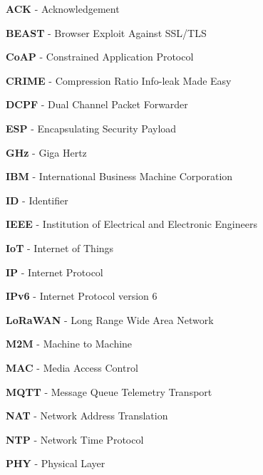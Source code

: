 \documentclass{article}
\begin{document}
\textbf{ACK} - Acknowledgement
\newline

\textbf{BEAST} - Browser Exploit Against SSL/TLS
\newline

\textbf{CoAP} - Constrained Application Protocol
\newline

\textbf{CRIME} - Compression Ratio Info-leak Made Easy
\newline

\textbf{DCPF} - Dual Channel Packet Forwarder
\newline

\textbf{ESP} - Encapsulating Security Payload
\newline

\textbf{GHz} - Giga Hertz
\newline

\textbf{IBM} - International Business Machine Corporation
\newline

\textbf{ID} - Identifier
\newline

\textbf{IEEE} - Institution of Electrical and Electronic Engineers
\newline

\textbf{IoT} - Internet of Things
\newline

\textbf{IP} - Internet Protocol
\newline

\textbf{IPv6} - Internet Protocol version 6
\newline

\textbf{LoRaWAN} - Long Range Wide Area Network
\newline

\textbf{M2M} - Machine to Machine
\newline

\textbf{MAC} - Media Access Control
\newline

\textbf{MQTT} - Message Queue Telemetry Transport
\newline

\textbf{NAT} - Network Address Translation
\newline

\textbf{NTP} - Network Time Protocol
\newline

\textbf{PHY} - Physical Layer
\newline
\end{document}
